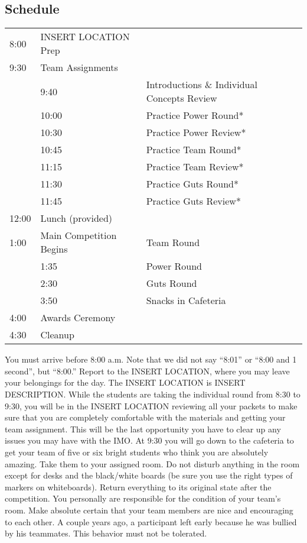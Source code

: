 \documentclass[11pt]{article}
\begin{document}
\begin{small}
\section{Schedule}
\begin{tabular}{l l l }
  8:00 & INSERT LOCATION Prep & \\
  9:30 & Team Assignments \\
  & 9:40 & Introductions \& Individual Concepts Review \\
  & 10:00 & Practice Power Round* \\
  & 10:30 & Practice Power Review* \\
  & 10:45 & Practice Team Round* \\
  & 11:15 & Practice Team Review* \\
  & 11:30 & Practice Guts Round* \\
  & 11:45 & Practice Guts Review* \\
 12:00 & Lunch (provided) \\
  1:00 & Main Competition Begins & Team Round \\
	& 1:35 & Power Round \\
	& 2:30 & Guts Round \\
  & 3:50 & Snacks in Cafeteria \\
  4:00 & Awards Ceremony \\
  4:30 & Cleanup \\
\end{tabular}

\vspace{0.5cm}

\noindent You must arrive before 8:00 a.m. Note that we did not say ``8:01'' or ``8:00 and 1 second'', but ``8:00.'' 
Report to the INSERT LOCATION, where you may leave your belongings for the day. The INSERT LOCATION is INSERT DESCRIPTION.
While the students are taking the individual round from 8:30 to 9:30, you will be in the INSERT LOCATION reviewing all your packets to make sure that you
are completely comfortable with the materials and getting your team assignment. This will be the last opportunity you have to clear up any issues you
may have with the IMO. At 9:30 you will go down to the cafeteria to get your team of five or six bright students who think you are absolutely amazing.
Take them to your assigned room. Do not disturb anything in the room except for desks and the black/white boards (be sure you use the right types
of markers on whiteboards). Return everything to its original state after the competition. You personally are responsible for the condition of your team's room.
Make absolute certain that your team members are nice and encouraging to each other. A couple years ago, a participant left early because he was bullied by his teammates.
This behavior must not be tolerated.


\end{small}
\end{document}
